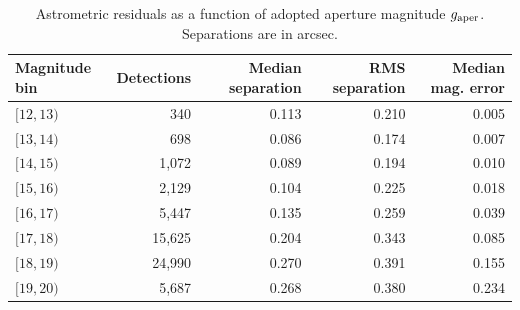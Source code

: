 \begin{table}
\centering
\caption{Astrometric residuals as a function of adopted aperture magnitude $g_{\rm aper}$. Separations are in arcsec.}
\label{tab:mag_astrometry}
\footnotesize
\setlength{\tabcolsep}{6pt}
\renewcommand{\arraystretch}{1.12}
\begin{tabular}{lrrrr}
\toprule
Magnitude bin & Detections & Median separation & RMS separation & Median mag. error \\
\midrule
$[12,13)$ & 340 & 0.113 & 0.210 & 0.005 \\
$[13,14)$ & 698 & 0.086 & 0.174 & 0.007 \\
$[14,15)$ & 1,072 & 0.089 & 0.194 & 0.010 \\
$[15,16)$ & 2,129 & 0.104 & 0.225 & 0.018 \\
$[16,17)$ & 5,447 & 0.135 & 0.259 & 0.039 \\
$[17,18)$ & 15,625 & 0.204 & 0.343 & 0.085 \\
$[18,19)$ & 24,990 & 0.270 & 0.391 & 0.155 \\
$[19,20)$ & 5,687 & 0.268 & 0.380 & 0.234 \\
\bottomrule
\end{tabular}
\end{table}
